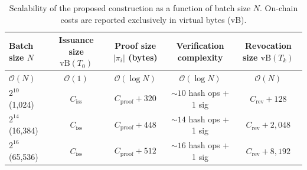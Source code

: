 \begin{table}[!t]
\caption{Scalability of the proposed construction as a function of batch size $N$. On-chain costs are reported exclusively in virtual bytes (vB).}
\label{tab:scaling_summary}
\centering
\small
\renewcommand{\arraystretch}{1.15}
\setlength{\tabcolsep}{6pt}
\begin{tabular}{lcccc}
\toprule
\textbf{Batch size $N$} &
\textbf{Issuance size $\mathrm{vB}(T_0)$} &
\textbf{Proof size $|\pi_i|$ (bytes)} &
\textbf{Verification complexity} &
\textbf{Revocation size $\mathrm{vB}(T_k)$} \\
\midrule
$\mathcal{O}(N)$ &
$\mathcal{O}(1)$ &
$\mathcal{O}(\log N)$ &
$\mathcal{O}(\log N)$ &
$\mathcal{O}(N)$ \\
\midrule
$2^{10}$ (1,024) &
$C_{\mathrm{iss}}$ &
$C_{\mathrm{proof}} + 320$ &
$\sim 10$ hash ops + 1 sig &
$C_{\mathrm{rev}} + 128$ \\
$2^{14}$ (16,384) &
$C_{\mathrm{iss}}$ &
$C_{\mathrm{proof}} + 448$ &
$\sim 14$ hash ops + 1 sig &
$C_{\mathrm{rev}} + 2,048$ \\
$2^{16}$ (65,536) &
$C_{\mathrm{iss}}$ &
$C_{\mathrm{proof}} + 512$ &
$\sim 16$ hash ops + 1 sig &
$C_{\mathrm{rev}} + 8,192$ \\
\bottomrule
\end{tabular}
\end{table}